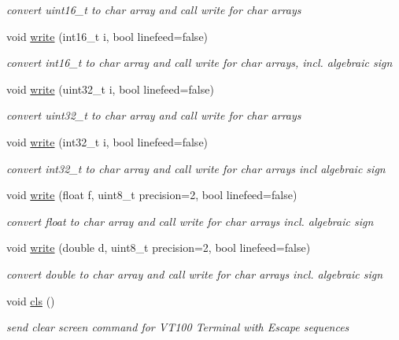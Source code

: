 \begin{DoxyCompactItemize}
\begin{DoxyCompactList}\small\item\em convert uint16\+\_\+t to char array and call write for char arrays \end{DoxyCompactList}\item 
void \hyperlink{classmy_uart_a49fd7a42b8cebe109f82c13f56f70b86}{write} (int16\+\_\+t i, bool linefeed=false)
\begin{DoxyCompactList}\small\item\em convert int16\+\_\+t to char array and call write for char arrays, incl. algebraic sign \end{DoxyCompactList}\item 
void \hyperlink{classmy_uart_a5acb02c4fd6606432a35afd9c94e0d7e}{write} (uint32\+\_\+t i, bool linefeed=false)
\begin{DoxyCompactList}\small\item\em convert uint32\+\_\+t to char array and call write for char arrays \end{DoxyCompactList}\item 
void \hyperlink{classmy_uart_a9d3c87876b26d17b23b1fc5aac850991}{write} (int32\+\_\+t i, bool linefeed=false)
\begin{DoxyCompactList}\small\item\em convert int32\+\_\+t to char array and call write for char arrays incl algebraic sign \end{DoxyCompactList}\item 
void \hyperlink{classmy_uart_a9b3b568689c37bf0320d2613bfc5f160}{write} (float f, uint8\+\_\+t precision=2, bool linefeed=false)
\begin{DoxyCompactList}\small\item\em convert float to char array and call write for char arrays incl. algebraic sign \end{DoxyCompactList}\item 
void \hyperlink{classmy_uart_a7b78410a05298bd168d02e95edd281c7}{write} (double d, uint8\+\_\+t precision=2, bool linefeed=false)
\begin{DoxyCompactList}\small\item\em convert double to char array and call write for char arrays incl. algebraic sign \end{DoxyCompactList}\item 
void \hyperlink{classmy_uart_a616b3ffa4c6e27ffadeefdd40b08d19f}{cls} ()
\begin{DoxyCompactList}\small\item\em send clear screen command for V\+T100 Terminal with Escape sequences \end{DoxyCompactList}\item 

\end{DoxyCompactItemize}
